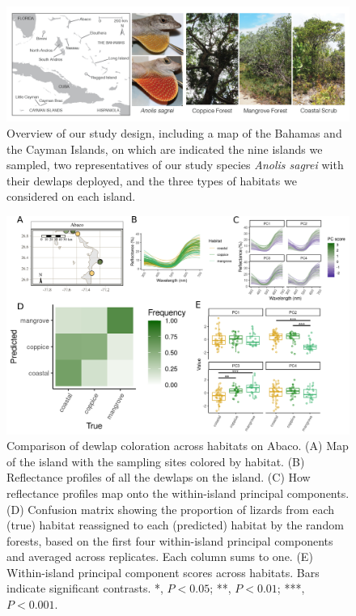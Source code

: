 \begin{figure}[H]
	\centering
	\includegraphics[width=\textwidth]{figures/Figure1_CMD-01_cropped.png}
	\caption{Overview of our study design, including a map of the Bahamas and the Cayman Islands, on which are indicated the nine islands we sampled, two representatives of our study species \textit{Anolis sagrei} with their dewlaps deployed, and the three types of habitats we considered on each island.}
	\label{fig:overview}
\end{figure}

\begin{figure}[H]
	\centering
	\includegraphics[width=\textwidth]{figures/Abaco_2.2.png}
	\caption{Comparison of dewlap coloration across habitats on Abaco. (A) Map of the island with the sampling sites colored by habitat. (B) Reflectance profiles of all the dewlaps on the island. (C) How reflectance profiles map onto the within-island principal components. (D) Confusion matrix showing the proportion of lizards from each (true) habitat reassigned to each (predicted) habitat by the random forests, based on the first four within-island principal components and averaged across replicates. Each column sums to one. (E) Within-island principal component scores across habitats. Bars indicate significant contrasts. *, $P < 0.05$; **, $P < 0.01$; ***, $P < 0.001$.}
	\label{fig:Abaco}
\end{figure}